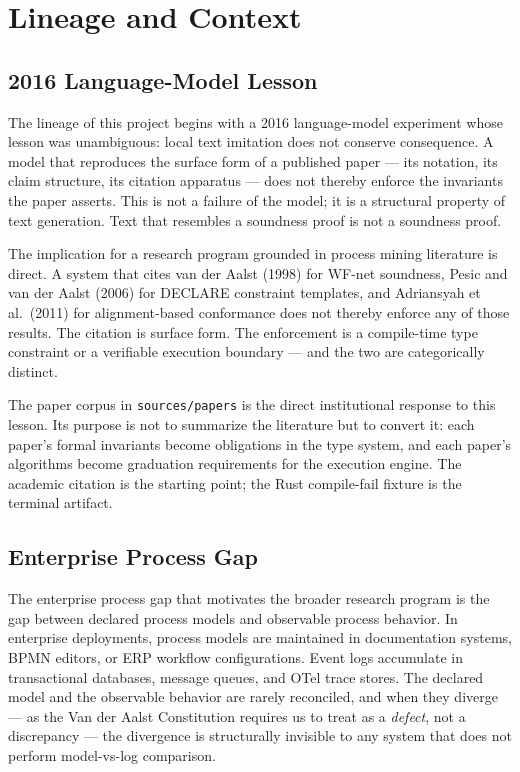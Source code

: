 
\section{Lineage and Context}
\label{sec:sources-papers-lineage}

\subsection{2016 Language-Model Lesson}
\label{sec:sources-papers-lineage-2016}

The lineage of this project begins with a 2016 language-model experiment whose
lesson was unambiguous: local text imitation does not conserve consequence.
A model that reproduces the surface form of a published paper --- its notation,
its claim structure, its citation apparatus --- does not thereby enforce the
invariants the paper asserts. This is not a failure of the model; it is a
structural property of text generation. Text that resembles a soundness proof
is not a soundness proof.

The implication for a research program grounded in process mining literature
is direct. A system that cites van der Aalst (1998) for WF-net soundness,
Pesic and van der Aalst (2006) for DECLARE constraint templates, and Adriansyah
et al.\ (2011) for alignment-based conformance does not thereby enforce any of
those results. The citation is surface form. The enforcement is a compile-time
type constraint or a verifiable execution boundary --- and the two are
categorically distinct.

The paper corpus in \texttt{sources/papers} is the direct institutional
response to this lesson. Its purpose is not to summarize the literature but to
convert it: each paper's formal invariants become obligations in the type
system, and each paper's algorithms become graduation requirements for the
execution engine. The academic citation is the starting point; the Rust
compile-fail fixture is the terminal artifact.

\subsection{Enterprise Process Gap}
\label{sec:sources-papers-lineage-enterprise}

The enterprise process gap that motivates the broader research program is the
gap between declared process models and observable process behavior. In
enterprise deployments, process models are maintained in documentation systems,
BPMN editors, or ERP workflow configurations. Event logs accumulate in
transactional databases, message queues, and OTel trace stores. The declared
model and the observable behavior are rarely reconciled, and when they
diverge --- as the Van der Aalst Constitution requires us to treat as a
\emph{defect}, not a discrepancy --- the divergence is structurally invisible
to any system that does not perform model-vs-log comparison.

